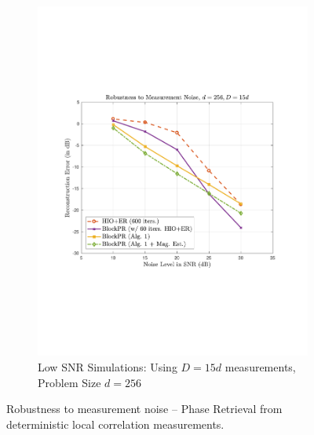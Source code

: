 \begin{figure}[hbtp]
\begin{subfigure}[b]{0.495\textwidth}
\includegraphics[clip=true, trim = 0.75in 2.75in 1in 2.5in,scale=0.45]{pics/robustness_600d}
\caption{Low SNR Simulations: Using $D=15d$ measurements, Problem Size $d=256$}
\label{fig:lowsnr_256}
\end{subfigure}
\caption{Robustness to measurement noise -- Phase Retrieval from 
deterministic local correlation measurements.}
\label{fig:noise-local}
\end{figure}
%

